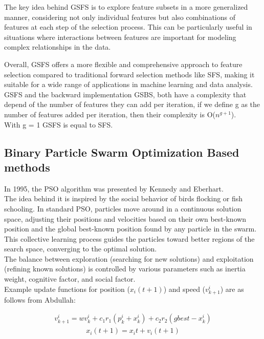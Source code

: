 \documentclass{Configuration_Files/PoliMi3i_thesis}
\begin{document}
The key idea behind GSFS is to explore feature subsets in a more generalized manner, considering not only individual features but also combinations of features at each step of the selection process. This can be particularly useful in situations where interactions between features are important for modeling complex relationships in the data.

Overall, GSFS offers a more flexible and comprehensive approach to feature selection compared to traditional forward selection methods like SFS, making it suitable for a wide range of applications in machine learning and data analysis. \cite{radmanGeneralizedSequentialForward2019}
GSFS and the backward implementation GSBS, both have a complexity that depend of the number of features they can add per iteration, if we define g as the number of features added per iteration, then their complexity is O($n^{g+1}$). \\
 With g = 1 GSFS is equal to SFS.

\subsection{Binary Particle Swarm Optimization Based methods}

In 1995, the PSO algorithm was presented by Kennedy and Eberhart. \cite{okwuMetaheuristicOptimizationNatureInspired2020} \\
The idea behind it is inspired by the social behavior of birds flocking or fish schooling. \cite{vanneschiParticleSwarmOptimization2023}
In standard PSO, particles move around in a continuous solution space, adjusting their positions and velocities based on their own best-known position and the global best-known position found by any particle in the swarm.
\\
This collective learning process guides the particles toward better regions of the search space, converging to the optimal solution. \\
The balance between exploration (searching for new solutions) and exploitation (refining known solutions) is controlled by various parameters such as inertia weight, cognitive factor, and social factor. \\
Example update functions for position ($x_{i}(t+1)$) and speed ($v^{i}_{k+1}$) are as follows from Abdullah\cite{abdullahEEGChannelSelection2022}:

\begin{align}
	v_{k+1}^i=w v_k^i+c_1 r_1\left(p_k^i+x_k^i\right)+c_2 r_2\left(g b e s t-x_k^i\right)
	\label{eq:bpso1}
\end{align}
\begin{align}
	x_i(t+1)=x_i t+v_i(t+1)
	\label{eq:bpso2}
\end{align}
\end{document}
